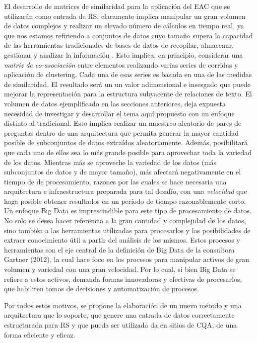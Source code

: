 \bigskip El desarrollo de matrices de similaridad para la aplicación del EAC que se utilizarán como entrada de RS, claramente implica manipular un gran volumen de datos complejos y realizar un elevado número de cálculos en tiempo real, ya que nos estamos refiriendo a conjuntos de datos cuyo tamaño supera la capacidad de las herramientas tradicionales de bases de datos de recopilar, almacenar, gestionar y analizar la información \citep{de2016mineria}. Esto implica, en principio, considerar una \textit{matriz de co-asociación} entre elementos realizando varias series de corridas y aplicación de clustering. Cada una de esas series es basada en una de las medidas de similaridad. El resultado será un un valor adimensional e insesgado que puede mejorar la representación para la estructura subyacente de relaciones de texto. El volumen de datos ejemplificado en las secciones anteriores, deja expuesta necesidad de investigar y desarrollar el tema aquí propuesto con un enfoque distinto al tradicional. Esto implica realizar un muestreo aleatorio de pares de preguntas dentro de una arquitectura que permita generar la mayor cantidad posible de subconjuntos de datos extraídos aleatoriamente. Además, posibilitará que cada uno de ellos sea lo más grande posible para aprovechar toda la variedad de los datos. Mientras más se aproveche la variedad de los datos (más subconjuntos de datos y de mayor tamaño), más afectará negativamente en el tiempo de de procesamiento, razones por las cuales se hace necesaria una arquitectura e infraestructura preparada para tal desafío, con una \textit{velocidad} que haga posible obtener resultados en un período de tiempo razonablemente corto. Un enfoque Big Data es imprescindible  para este tipo de procesamiento de datos. No solo se desea hacer referencia a la gran cantidad y complejidad de los datos, sino también a las herramientas utilizadas para procesarlos y las posibilidades de extraer conocimiento útil a partir del análisis de los mismos. Estos procesos y herramientas son el eje central de la definición de Big Data de la consultora Gartner (2012), la cual hace foco en los procesos para manipular activos de gran volumen y variedad con una gran velocidad. Por lo cual, si bien Big Data se refiere a estos activos, demanda formas innovadoras y efectivas de procesarlos, que habiliten tomas de decisiones y automatización de procesos.

\bigskip Por todos estos motivos, se propone la elaboración de un nuevo método y una arquitectura que lo soporte, que genere una entrada de datos correctamente estructurada para RS y que pueda ser utilizada da en sitios de CQA, de una forma eficiente y eficaz.
